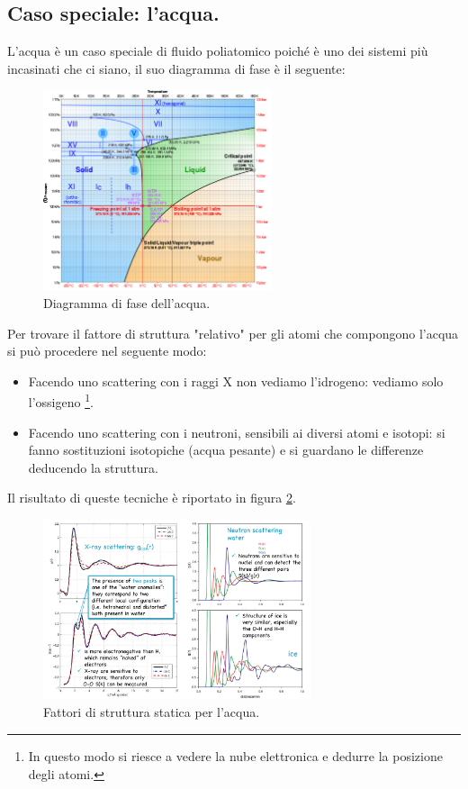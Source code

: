 \subsection{Caso speciale: l'acqua.}
\label{subsec:Caso speciale: l'acqua.}
L'acqua è un caso speciale di fluido poliatomico poiché è uno dei sistemi più incasinati che ci siano, il suo diagramma di fase è il seguente:
\begin{figure}[H]
	\centering
	\includegraphics[width=0.6\textwidth]{figures/acqua-fase.png}
	\caption{Diagramma di fase dell'acqua.}
	\label{fig:figures-acqua-fase-png}
\end{figure}
Per trovare il fattore di struttura "relativo" per gli atomi che compongono l'acqua si può procedere nel seguente modo:
\begin{itemize}
	\item 
		Facendo uno scattering con i raggi X non vediamo l'idrogeno: 
		vediamo solo l'ossigeno \footnote{In questo modo si riesce a vedere
		la nube elettronica e dedurre la posizione degli atomi.}.
	\item 
		Facendo uno scattering con i neutroni, sensibili ai diversi atomi e
		isotopi: si fanno sostituzioni isotopiche (acqua pesante) e si guardano 
		le differenze deducendo la struttura.
\end{itemize}
Il risultato di queste tecniche è riportato in figura \ref{fig:S-acqua}.
\begin{figure}[ht]
	\centering
	\includegraphics[width=0.7\textwidth]{figures/S-acqua.png}
	\caption{Fattori di struttura statica per l'acqua.}
	\label{fig:S-acqua}
\end{figure}
